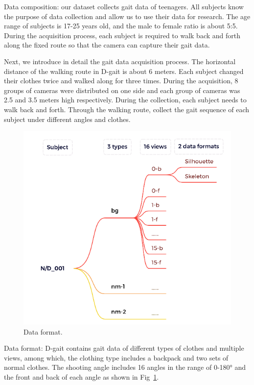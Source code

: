 \documentclass[10pt,twocolumn,letterpaper]{article}
\begin{document}
Data composition:
our dataset collects gait data of teenagers.
All subjects know the purpose of data collection and allow us to use their data for research.
The age range of subjects is 17-25 years old, and the male to female ratio is about 5:5.
During the acquisition process, each subject is required to walk back and forth along the fixed route so that the camera can capture their gait data.

Next, we introduce in detail the gait data acquisition process.
The horizontal distance of the walking route in D-gait is about 6 meters.
Each subject changed their clothes twice and walked along for three times.
During the acquisition, 8 groups of cameras were distributed on one side and each group of cameras was 2.5 and 3.5 meters high respectively.
During the collection, each subject needs to walk back and forth.
Through the walking route, collect the gait sequence of each subject under different angles and clothes.

\begin{figure}[t]
  \centering
   \includegraphics[width=1.0\linewidth]{figures/Data format.png}

   \caption{Data format.
   }
   \label{Data format}
\end{figure}

Data format:
D-gait contains gait data of different types of clothes and multiple views, among which, the clothing type includes a backpack and two sets of normal clothes.
The shooting angle includes 16 angles in the range of 0-180° and the front and back of each angle as shown in Fig~\ref{Data format}.
\end{document}

